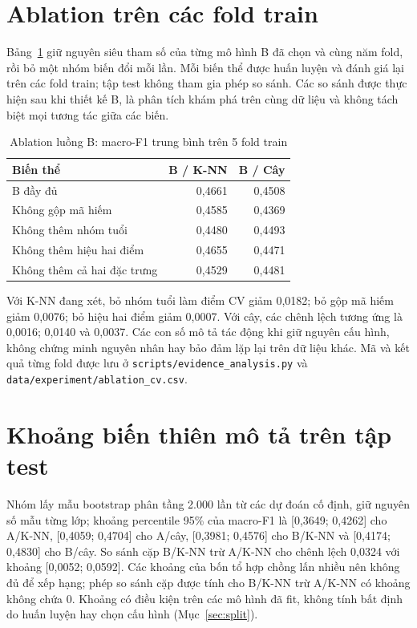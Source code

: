 \section{Ablation trên các fold train}\label{sec:ablation}
Bảng~\ref{tab:ablation} giữ nguyên siêu tham số của từng mô hình B đã chọn và cùng năm fold, rồi bỏ một nhóm biến đổi mỗi lần. Mỗi biến thể được huấn luyện và đánh giá lại trên các fold train; tập test không tham gia phép so sánh. Các so sánh được thực hiện sau khi thiết kế B, là phân tích khám phá trên cùng dữ liệu và không tách biệt mọi tương tác giữa các biến.
\begin{table}[H]\centering\small
\caption{Ablation luồng B: macro-F1 trung bình trên 5 fold train}\label{tab:ablation}
\begin{tabular}{lrr}\toprule
Biến thể & B / K-NN & B / Cây\\\midrule
B đầy đủ & 0,4661 & 0,4508\\
Không gộp mã hiếm & 0,4585 & 0,4369\\
Không thêm nhóm tuổi & 0,4480 & 0,4493\\
Không thêm hiệu hai điểm & 0,4655 & 0,4471\\
Không thêm cả hai đặc trưng & 0,4529 & 0,4481\\\bottomrule
\end{tabular}\end{table}
Với K-NN đang xét, bỏ nhóm tuổi làm điểm CV giảm 0,0182; bỏ gộp mã hiếm giảm 0,0076; bỏ hiệu hai điểm giảm 0,0007. Với cây, các chênh lệch tương ứng là 0,0016; 0,0140 và 0,0037. Các con số mô tả tác động khi giữ nguyên cấu hình, không chứng minh nguyên nhân hay bảo đảm lặp lại trên dữ liệu khác. Mã và kết quả từng fold được lưu ở \texttt{scripts/evidence\_analysis.py} và \texttt{data/experiment/ablation\_cv.csv}.

\section{Khoảng biến thiên mô tả trên tập test}
Nhóm lấy mẫu bootstrap phân tầng 2.000 lần từ các dự đoán cố định, giữ nguyên số mẫu từng lớp; khoảng percentile 95\% của macro-F1 là [0,3649; 0,4262] cho A/K-NN, [0,4059; 0,4704] cho A/cây, [0,3981; 0,4576] cho B/K-NN và [0,4174; 0,4830] cho B/cây. So sánh cặp B/K-NN trừ A/K-NN cho chênh lệch 0,0324 với khoảng [0,0052; 0,0592]. Các khoảng của bốn tổ hợp chồng lấn nhiều nên không đủ để xếp hạng; phép so sánh cặp được tính cho B/K-NN trừ A/K-NN có khoảng không chứa 0. Khoảng có điều kiện trên các mô hình đã fit, không tính bất định do huấn luyện hay chọn cấu hình (Mục~\ref{sec:split}).


